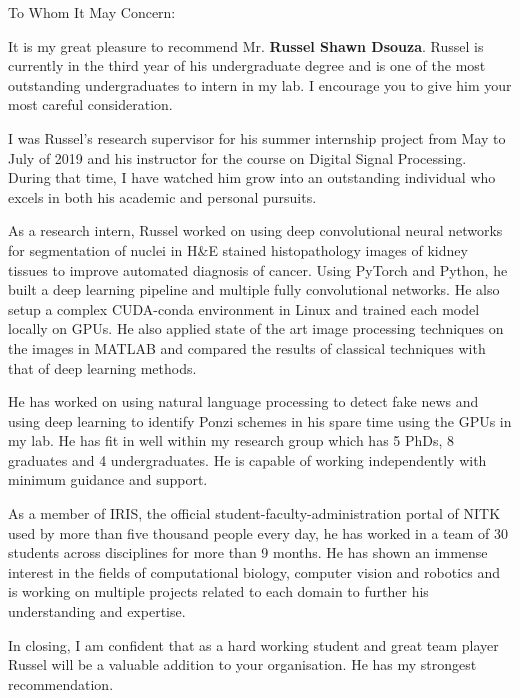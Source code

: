 \documentclass[12pt]{article}
\begin{document}
\noindent
To Whom It May Concern:

\bigskip
\noindent
It is my great pleasure to recommend Mr. \textbf{Russel Shawn Dsouza}. Russel is currently in the third year of his undergraduate degree and is one of the most outstanding undergraduates to intern in my lab. I encourage you to give him your most careful consideration.

\medskip
\noindent
I was Russel's research supervisor for his summer internship project from May to July of 2019 and his instructor for the course on Digital Signal Processing.
During that time, I have watched him grow into an outstanding individual who excels in both his academic and personal pursuits.

\medskip
\noindent
As a research intern, Russel worked on using deep convolutional neural networks for segmentation of nuclei in H\&E stained histopathology images of kidney tissues to improve automated diagnosis of cancer.
Using PyTorch and Python, he built a deep learning pipeline and multiple fully convolutional networks. He also setup a complex CUDA-conda environment in Linux and trained each model locally on GPUs.
He also applied state of the art image processing techniques on the images in MATLAB and compared the results of classical techniques with that of deep learning methods.

\medskip
\noindent
He has worked on using natural language processing to detect fake news and using deep learning to identify Ponzi schemes in his spare time using the GPUs in my lab.
He has fit in well within my research group which has 5 PhDs, 8 graduates and 4 undergraduates.
He is capable of working independently with minimum guidance and support. 

\medskip
\noindent
As a member of IRIS, the official student-faculty-administration portal of NITK used by more than five thousand people every day, he has worked in a team of 30 students across disciplines for more than 9 months.
He has shown an immense interest in the fields of computational biology, computer vision and robotics and is working on multiple projects related to each domain to further his understanding and expertise.

\medskip
\noindent
In closing, I am confident that as a hard working student and great team player Russel will be a valuable addition to your organisation. He has my strongest recommendation.
\end{document}
